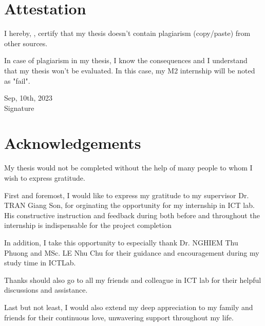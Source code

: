 \documentclass[12pt]{report}
\begin{document}
\chapter*{Attestation}
I hereby, \theauthor, certify that my thesis doesn’t contain plagiarism (copy/paste) from other sources.

\vspace{5mm}
\noindent%
In case of plagiarism in my thesis, I know the consequences and I understand that my thesis won’t be evaluated. In this case, my M2 internship will be noted as "fail". 

\vspace{1cm}
\noindent%
Sep, 10th, 2023 \\
Signature 

\vspace{2cm}
\noindent%
\theauthor

\chapter*{Acknowledgements}

\noindent%
My thesis would not be completed without the help of many people to whom I wish to express gratitude. 

First and foremost, I would like to express my gratitude to my supervisor Dr. TRAN Giang Son, for orginating the opportunity for my internship in ICT lab. His constructive instruction and feedback during both before and throughout the internship is indispensable for the project completion

\vspace{5mm}
\noindent%
In addition, I take this opportunity to especially thank Dr. NGHIEM Thu Phuong and MSc. LE Nhu Chu for their guidance and encouragement during my study time in ICTLab.

\vspace{5mm}
\noindent%
Thanks should also go to all my friends and colleague in ICT lab for their helpful discussions and assistance. 

\vspace{5mm}
\noindent%
Last but not least, I would also extend my deep appreciation to my family and friends for their continuous love, unwavering support throughout my life.


\noindent%
 \newline


\tableofcontents
\clearpage
\thispagestyle{empty}
\end{document}
